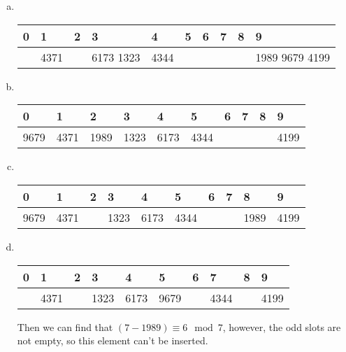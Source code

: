 \documentclass{article}
\begin{document}
\section{}
\begin{enumerate}[(a)]
\item \ 
\begin{center}
\begin{tabular}{|m{2em}<{\centering}|m{2em}<{\centering}|m{2em}<{\centering}|m{2em}<{\centering}|m{2em}<{\centering}|m{2em}<{\centering}|m{2em}<{\centering}|m{2em}<{\centering}|m{2em}<{\centering}|m{2em}<{\centering}|}
\hline
0 & 1 & 2 & 3 & 4 & 5 & 6 & 7 & 8 & 9 \\\hline
& 4371 & & 6173 1323 & 4344 & & & & & 1989 9679 4199 \\\hline
\end{tabular}
\end{center}
\item \ 
\begin{center}
\begin{tabular}{|m{2em}<{\centering}|m{2em}<{\centering}|m{2em}<{\centering}|m{2em}<{\centering}|m{2em}<{\centering}|m{2em}<{\centering}|m{2em}<{\centering}|m{2em}<{\centering}|m{2em}<{\centering}|m{2em}<{\centering}|}
\hline
0 & 1 & 2 & 3 & 4 & 5 & 6 & 7 & 8 & 9 \\\hline
9679 & 4371 & 1989 & 1323 & 6173 & 4344 & & & & 4199 \\\hline
\end{tabular}
\end{center}
\item \ 
\begin{center}
\begin{tabular}{|m{2em}<{\centering}|m{2em}<{\centering}|m{2em}<{\centering}|m{2em}<{\centering}|m{2em}<{\centering}|m{2em}<{\centering}|m{2em}<{\centering}|m{2em}<{\centering}|m{2em}<{\centering}|m{2em}<{\centering}|}
\hline
0 & 1 & 2 & 3 & 4 & 5 & 6 & 7 & 8 & 9 \\\hline
9679 & 4371 & & 1323 & 6173 & 4344 &&& 1989 & 4199 \\\hline
\end{tabular}
\end{center}
\item \ 
\begin{center}
\begin{tabular}{|m{2em}<{\centering}|m{2em}<{\centering}|m{2em}<{\centering}|m{2em}<{\centering}|m{2em}<{\centering}|m{2em}<{\centering}|m{2em}<{\centering}|m{2em}<{\centering}|m{2em}<{\centering}|m{2em}<{\centering}|}
\hline
0 & 1 & 2 & 3 & 4 & 5 & 6 & 7 & 8 & 9 \\\hline
 & 4371 & & 1323 & 6173 & 9679 & & 4344 & & 4199 \\\hline
\end{tabular}
\end{center}
Then we can find that $(7-1989)\equiv 6\mod 7$, however, the odd slots are not empty, so this element can't be inserted.
\end{enumerate}
\end{document}
